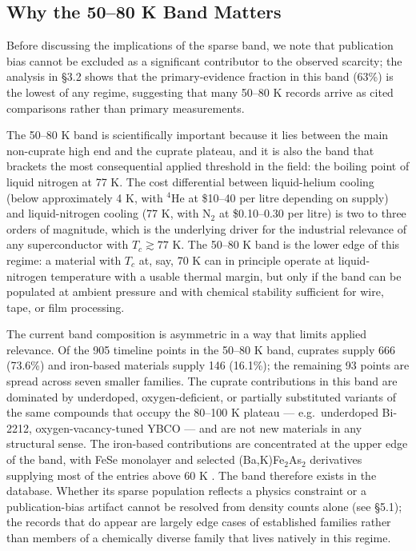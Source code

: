 \documentclass[11pt]{article}
\begin{document}
\subsection{Why the 50--80 K Band Matters}

Before discussing the implications of the sparse band, we note that publication bias cannot be excluded as a significant contributor to the observed scarcity; the analysis in \S3.2 shows that the primary-evidence fraction in this band (63\%) is the lowest of any regime, suggesting that many 50--80 K records arrive as cited comparisons rather than primary measurements.

The 50--80 K band is scientifically important because it lies between the main non-cuprate high end and the cuprate plateau, and it is also the band that brackets the most consequential applied threshold in the field: the boiling point of liquid nitrogen at 77 K. The cost differential between liquid-helium cooling (below approximately 4 K, with $^4$He at \$10--40 per litre depending on supply) and liquid-nitrogen cooling (77 K, with N$_2$ at \$0.10--0.30 per litre) is two to three orders of magnitude, which is the underlying driver for the industrial relevance of any superconductor with $T_c \gtrsim 77$ K. The 50--80 K band is the lower edge of this regime: a material with $T_c$ at, say, 70 K can in principle operate at liquid-nitrogen temperature with a usable thermal margin, but only if the band can be populated at ambient pressure and with chemical stability sufficient for wire, tape, or film processing.

The current band composition is asymmetric in a way that limits applied relevance. Of the 905 timeline points in the 50--80 K band, cuprates supply 666 (73.6\%) and iron-based materials supply 146 (16.1\%); the remaining 93 points are spread across seven smaller families. The cuprate contributions in this band are dominated by underdoped, oxygen-deficient, or partially substituted variants of the same compounds that occupy the 80--100 K plateau --- e.g.\ underdoped Bi-2212, oxygen-vacancy-tuned YBCO --- and are not new materials in any structural sense. The iron-based contributions are concentrated at the upper edge of the band, with FeSe monolayer and selected (Ba,K)Fe$_2$As$_2$ derivatives supplying most of the entries above 60 K \cite{stewart2011ironpnictidesreview}. The band therefore exists in the database. Whether its sparse population reflects a physics constraint or a publication-bias artifact cannot be resolved from density counts alone (see \S5.1); the records that do appear are largely edge cases of established families rather than members of a chemically diverse family that lives natively in this regime.
\end{document}
